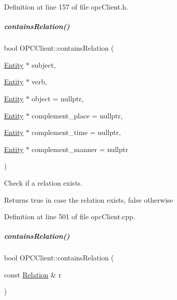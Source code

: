 Definition at line 157 of file opc\+Client.\+h.

\mbox{\label{group__icubclient__clients_a8679fddd5ea40734a4da2d89ec6155c7}} 
\subparagraph{\texorpdfstring{contains\+Relation()}{containsRelation()}\hspace{0.1cm}{\footnotesize\ttfamily [1/2]}}
{\footnotesize\ttfamily bool O\+P\+C\+Client\+::contains\+Relation (\begin{DoxyParamCaption}\item[{\hyperlink{group__icubclient__representations_classicubclient_1_1Entity}{Entity} $\ast$}]{subject,  }\item[{\hyperlink{group__icubclient__representations_classicubclient_1_1Entity}{Entity} $\ast$}]{verb,  }\item[{\hyperlink{group__icubclient__representations_classicubclient_1_1Entity}{Entity} $\ast$}]{object = {\ttfamily nullptr},  }\item[{\hyperlink{group__icubclient__representations_classicubclient_1_1Entity}{Entity} $\ast$}]{complement\+\_\+place = {\ttfamily nullptr},  }\item[{\hyperlink{group__icubclient__representations_classicubclient_1_1Entity}{Entity} $\ast$}]{complement\+\_\+time = {\ttfamily nullptr},  }\item[{\hyperlink{group__icubclient__representations_classicubclient_1_1Entity}{Entity} $\ast$}]{complement\+\_\+manner = {\ttfamily nullptr} }\end{DoxyParamCaption})}



Check if a relation exists. 

\begin{DoxyReturn}{Returns}
true in case the relation exists, false otherwise 
\end{DoxyReturn}


Definition at line 501 of file opc\+Client.\+cpp.

\mbox{\label{group__icubclient__clients_af024cf7dd739214e22c176911740778a}} 
\subparagraph{\texorpdfstring{contains\+Relation()}{containsRelation()}\hspace{0.1cm}{\footnotesize\ttfamily [2/2]}}
{\footnotesize\ttfamily bool O\+P\+C\+Client\+::contains\+Relation (\begin{DoxyParamCaption}\item[{const \hyperlink{group__icubclient__representations_classicubclient_1_1Relation}{Relation} \&}]{r }\end{DoxyParamCaption})}



